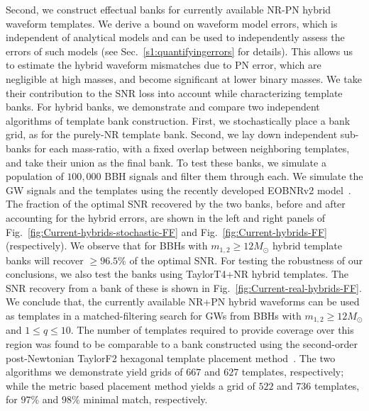 \documentclass[aps,
prd,
twocolumn,
superscriptaddress,
lengthcheck,showpacs,letterpaper,nofootinbib,
floatfix]{revtex4-1}
\begin{document}
Second, we construct effectual banks for currently available
NR-PN hybrid waveform templates. We derive a bound on waveform model
errors, which is independent of analytical models and can be used
to independently assess the errors of such models (see
Sec.~\ref{s1:quantifyingerrors} for details). This allows us to estimate
the hybrid waveform mismatches due to PN error, which are negligible
at high masses, and become significant at lower binary masses. We
take their contribution to the SNR loss into account while 
characterizing template banks. For hybrid banks, we demonstrate and 
compare two independent algorithms of template bank construction. 
First, we stochastically
place a bank grid, as for the purely-NR template bank. Second, we lay down
independent sub-banks for each mass-ratio, with a fixed overlap between
neighboring templates, and take their union as the final bank. 
To test these banks, we simulate a population of $100,000$ BBH signals
and filter them through each. We simulate the GW signals and the 
templates using the recently developed EOBNRv2 model~\cite{BuonannoEOBv2Main}. 
The fraction of the optimal SNR recovered by the two banks, before and after
accounting for the hybrid errors, are shown in the left and right panels 
of Fig.~\ref{fig:Current-hybrids-stochastic-FF} and 
Fig.~\ref{fig:Current-hybrids-FF} (respectively).
We observe that for BBHs with $m_{1,2}\geq 12M_\odot$ hybrid template 
banks will recover $\geq 96.5\%$ of the optimal SNR.  For testing the
robustness of our conclusions, we also test the banks using TaylorT4+NR
hybrid templates. The SNR recovery from a bank of these is shown in
Fig.~\ref{fig:Current-real-hybrids-FF}. We conclude that, 
the currently available NR+PN hybrid waveforms can be used as templates in 
a matched-filtering search for GWs from BBHs with $m_{1,2}\geq 12M_\odot$
and $1\leq q\leq 10$. The number of templates required to provide coverage
over this region was found to be comparable to a bank constructed using 
the second-order post-Newtonian TaylorF2 hexagonal template placement 
method~\cite{SathyaBankPlacementTauN,BabaketalBankPlacement,
SathyaMetric2PN,Cokelaer:2007kx}.
The two algorithms we demonstrate yield grids of $667$ and $627$ templates,
respectively; while the metric based placement method yields a grid of $522$ 
and $736$ templates, for $97\%$ and $98\%$ minimal match, respectively.
\end{document}
